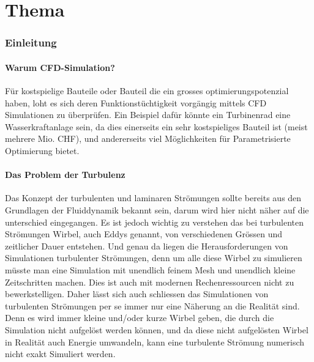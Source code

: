 %
%
%
%
\chapter{Thema\label{chapter:reynolds}}
\begin{refsection}

\subsection{Einleitung}

\subsubsection{Warum CFD-Simulation?}

Für kostspielige Bauteile oder Bauteil die ein grosses optimierungspotenzial haben,
loht es sich deren Funktionstüchtigkeit vorgängig mittels CFD Simulationen zu überprüfen.
Ein Beispiel dafür könnte ein Turbinenrad eine Wasserkraftanlage sein,
da dies einerseits ein sehr kostspieliges Bauteil ist (meist mehrere Mio. CHF),
und andererseits viel Möglichkeiten für Parametrisierte Optimierung bietet.

\subsubsection{Das Problem der Turbulenz}

Das Konzept der turbulenten und laminaren Strömungen sollte bereits aus den Grundlagen der Fluiddynamik bekannt sein, darum wird hier nicht näher auf die unterschied eingegangen.
Es ist jedoch wichtig zu verstehen das bei turbulenten Strömungen Wirbel, auch Eddys genannt, von verschiedenen Grössen und zeitlicher Dauer entstehen.
Und genau da liegen die Herausforderungen von Simulationen turbulenter Strömungen,
denn um alle diese Wirbel zu simulieren müsste man eine Simulation mit unendlich feinem Mesh und unendlich kleine Zeitschritten machen.
Dies ist auch mit modernen Rechenressourcen nicht zu bewerkstelligen.
Daher lässt sich auch schliessen das Simulationen von turbulenten Strömungen per se immer nur eine Näherung an die Realität sind.
Denn es wird immer kleine und/oder kurze Wirbel geben, die durch die Simulation nicht aufgelöst werden können,
und da diese nicht aufgelösten Wirbel in Realität auch Energie umwandeln, kann eine turbulente Strömung numerisch nicht exakt Simuliert werden.



\end{refsection}
